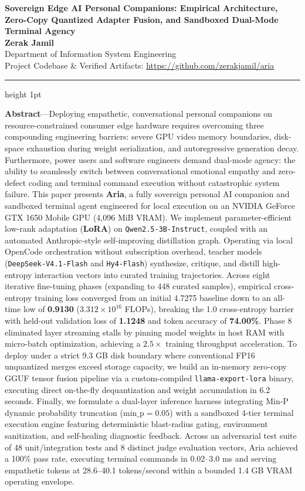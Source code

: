 \documentclass[10pt,a4paper]{article}
\begin{document}
\begin{center}
{\Large \textbf{Sovereign Edge AI Personal Companions: Empirical Architecture, Zero-Copy Quantized Adapter Fusion, and Sandboxed Dual-Mode Terminal Agency}}\\[3pt]
{\normalsize \textbf{Zerak Jamil}}\\[2pt]
{\small Department of Information System Engineering}\\[2pt]
{\footnotesize Project Codebase \& Verified Artifacts: \url{https://github.com/zerakjamil/aria}}
\end{center}
\vspace{-3pt}
\hrule height 1pt
\vspace{4pt}

\textbf{Abstract}---Deploying empathetic, conversational personal companions on resource-constrained consumer edge hardware requires overcoming three compounding engineering barriers: severe GPU video memory boundaries, disk-space exhaustion during weight serialization, and autoregressive generation decay. Furthermore, power users and software engineers demand dual-mode agency: the ability to seamlessly switch between conversational emotional empathy and zero-defect coding and terminal command execution without catastrophic system failure. This paper presents \textbf{Aria}, a fully sovereign personal AI companion and sandboxed terminal agent engineered for local execution on an NVIDIA GeForce GTX 1650 Mobile GPU (4,096 MiB VRAM). We implement parameter-efficient low-rank adaptation (\textbf{LoRA}) on \texttt{Qwen2.5-3B-Instruct}, coupled with an automated Anthropic-style self-improving distillation graph. Operating via local OpenCode orchestration without subscription overhead, teacher models (\texttt{DeepSeek-V4.1-Flash} and \texttt{Hy4-Flash}) synthesize, critique, and distill high-entropy interaction vectors into curated training trajectories. Across eight iterative fine-tuning phases (expanding to 448 curated samples), empirical cross-entropy training loss converged from an initial 4.7275 baseline down to an all-time low of \textbf{0.9130} ($3.312 \times 10^{16}$ FLOPs), breaking the 1.0 cross-entropy barrier with held-out validation loss of \textbf{1.1248} and token accuracy of \textbf{74.00\%}. Phase 8 eliminated layer streaming stalls by pinning model weights in host RAM with micro-batch optimization, achieving a $2.5\times$ training throughput acceleration. To deploy under a strict 9.3 GB disk boundary where conventional FP16 unquantized merges exceed storage capacity, we build an in-memory zero-copy GGUF tensor fusion pipeline via a custom-compiled \texttt{llama-export-lora} binary, executing direct on-the-fly dequantization and weight accumulation in 6.2 seconds. Finally, we formulate a dual-layer inference harness integrating Min-P dynamic probability truncation ($\text{min\_p} = 0.05$) with a sandboxed 4-tier terminal execution engine featuring deterministic blast-radius gating, environment sanitization, and self-healing diagnostic feedback. Across an adversarial test suite of 48 unit/integration tests and 8 distinct judge evaluation vectors, Aria achieved a 100\% pass rate, executing terminal commands in 0.02--3.0 ms and serving empathetic tokens at 28.6--40.1 tokens/second within a bounded 1.4 GB VRAM operating envelope.
\end{document}
